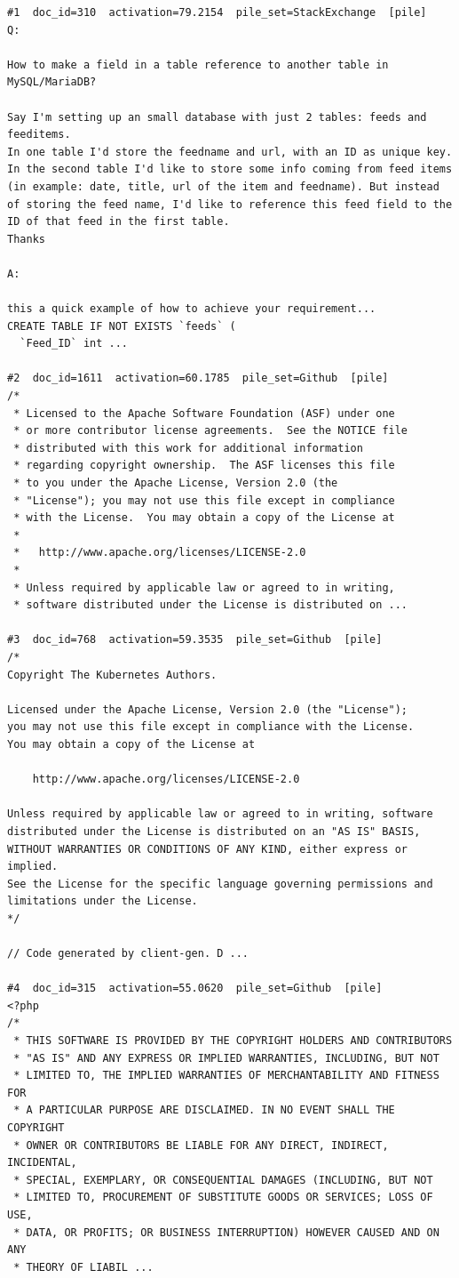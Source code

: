 \begin{verbatim}
#1  doc_id=310  activation=79.2154  pile_set=StackExchange  [pile]
Q:

How to make a field in a table reference to another table in MySQL/MariaDB?

Say I'm setting up an small database with just 2 tables: feeds and feeditems.
In one table I'd store the feedname and url, with an ID as unique key.
In the second table I'd like to store some info coming from feed items (in example: date, title, url of the item and feedname). But instead of storing the feed name, I'd like to reference this feed field to the ID of that feed in the first table.
Thanks

A:

this a quick example of how to achieve your requirement...
CREATE TABLE IF NOT EXISTS `feeds` (
  `Feed_ID` int ...

#2  doc_id=1611  activation=60.1785  pile_set=Github  [pile]
/*
 * Licensed to the Apache Software Foundation (ASF) under one
 * or more contributor license agreements.  See the NOTICE file
 * distributed with this work for additional information
 * regarding copyright ownership.  The ASF licenses this file
 * to you under the Apache License, Version 2.0 (the
 * "License"); you may not use this file except in compliance
 * with the License.  You may obtain a copy of the License at
 *
 *   http://www.apache.org/licenses/LICENSE-2.0
 *
 * Unless required by applicable law or agreed to in writing,
 * software distributed under the License is distributed on ...

#3  doc_id=768  activation=59.3535  pile_set=Github  [pile]
/*
Copyright The Kubernetes Authors.

Licensed under the Apache License, Version 2.0 (the "License");
you may not use this file except in compliance with the License.
You may obtain a copy of the License at

    http://www.apache.org/licenses/LICENSE-2.0

Unless required by applicable law or agreed to in writing, software
distributed under the License is distributed on an "AS IS" BASIS,
WITHOUT WARRANTIES OR CONDITIONS OF ANY KIND, either express or implied.
See the License for the specific language governing permissions and
limitations under the License.
*/

// Code generated by client-gen. D ...

#4  doc_id=315  activation=55.0620  pile_set=Github  [pile]
<?php
/*
 * THIS SOFTWARE IS PROVIDED BY THE COPYRIGHT HOLDERS AND CONTRIBUTORS
 * "AS IS" AND ANY EXPRESS OR IMPLIED WARRANTIES, INCLUDING, BUT NOT
 * LIMITED TO, THE IMPLIED WARRANTIES OF MERCHANTABILITY AND FITNESS FOR
 * A PARTICULAR PURPOSE ARE DISCLAIMED. IN NO EVENT SHALL THE COPYRIGHT
 * OWNER OR CONTRIBUTORS BE LIABLE FOR ANY DIRECT, INDIRECT, INCIDENTAL,
 * SPECIAL, EXEMPLARY, OR CONSEQUENTIAL DAMAGES (INCLUDING, BUT NOT
 * LIMITED TO, PROCUREMENT OF SUBSTITUTE GOODS OR SERVICES; LOSS OF USE,
 * DATA, OR PROFITS; OR BUSINESS INTERRUPTION) HOWEVER CAUSED AND ON ANY
 * THEORY OF LIABIL ...


\end{verbatim}

